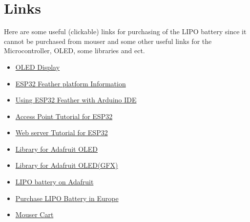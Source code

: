 \documentclass{article}
\begin{document}
\section{Links}
Here are some useful (clickable) links for purchasing of the LIPO battery since it cannot be purchased from mouser and some other useful links for the Microcontroller, OLED, some libraries and ect. 
\begin{itemize}
	\item \href{https://www.adafruit.com/product/938}{OLED Display} 
	\item \href{https://learn.adafruit.com/adafruit-huzzah32-esp32-feather?view=all}{ESP32 Feather platform Information}
	\item \href{https://learn.adafruit.com/adafruit-huzzah32-esp32-feather/using-with-arduino-ide}{Using ESP32 Feather with Arduino IDE}
	\item \href{https://randomnerdtutorials.com/esp32-access-point-ap-web-server/}{Access Point Tutorial for ESP32}
	\item \href{https://randomnerdtutorials.com/esp32-web-server-arduino-ide/}{Web server Tutorial for ESP32}
	\item \href{https://github.com/ThingPulse/esp8266-oled-ssd1306}{Library for Adafruit OLED}
	\item \href{https://github.com/adafruit/Adafruit-GFX-Library}{Library for Adafruit OLED(GFX)}
	\item \href{https://www.adafruit.com/product/258}{LIPO battery on Adafruit} 
	\item 	\href{https://eckstein-shop.de/LiPo-Akku-Lithium-Ion-Polymer-Batterie-37V-1200mAh-JST-PH-Connector?curr=EUR&gclid=Cj0KCQiAxNnfBRDwARIsAJlH29BLePjR8XtucLdkk6RyHy8WfTtGj7G8zkp6dZxTWrhhOybtX9XS7-0aAmj1EALw_wcB}{Purchase LIPO Battery in Europe}
	\item \href{https://www.mouser.com/ProjectManager/ProjectDetail.aspx?AccessID=9a8a02e45e}{Mouser Cart}
\end{itemize}
\end{document}
